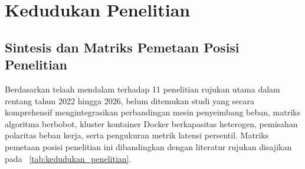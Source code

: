 \section{Kedudukan Penelitian}
\label{sec:kedudukan_penelitian}

\subsection{Sintesis dan Matriks Pemetaan Posisi Penelitian}
Berdasarkan telaah mendalam terhadap 11 penelitian rujukan utama dalam rentang tahun 2022 hingga 2026, belum ditemukan studi yang secara komprehensif mengintegrasikan perbandingan mesin penyeimbang beban, matriks algoritma berbobot, kluster kontainer Docker berkapasitas heterogen, pemisahan polaritas beban kerja, serta pengukuran metrik latensi persentil. Matriks pemetaan posisi penelitian ini dibandingkan dengan literatur rujukan disajikan pada \tablename\ \ref{tab:kedudukan_penelitian}.

